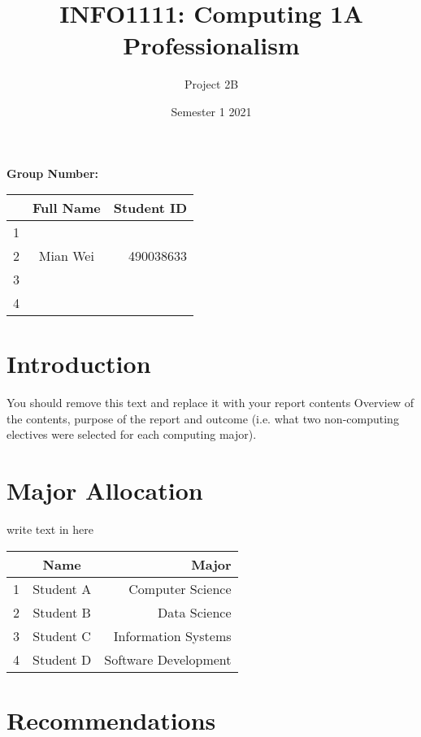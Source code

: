 \documentclass{article}
\title{INFO1111: Computing 1A Professionalism}
\date{Semester 1 2021}
\author{Project 2B}
\begin{document}
\maketitle

\begin{center}
    \textbf{Group Number:}
\end{center}

\begin{center}
\begin{tabular}{|l|c|r|}
\hline
  & Full Name & Student ID \\ \hline
1 &           &            \\ \hline
2 & Mian Wei  & 490038633  \\ \hline
3 &           &            \\ \hline
4 &           &            \\ \hline
\end{tabular}
\end{center}
\thispagestyle{empty}
\newpage

\setcounter{page}{1}
\section{Introduction}
You should remove this text and replace it with your report contents
Overview of the contents, purpose of the report and outcome (i.e. what two non-computing electives were selected for each computing major).


\section{Major Allocation}
write text in here
\begin{center}
\begin{tabular}{|l|c|r|}
\hline
  & Name      & Major                \\ \hline
1 & Student A & Computer Science     \\ \hline
2 & Student B & Data Science         \\ \hline
3 & Student C & Information Systems  \\ \hline
4 & Student D & Software Development \\ \hline
\end{tabular}
\end{center}

\section{Recommendations}
\end{document}
